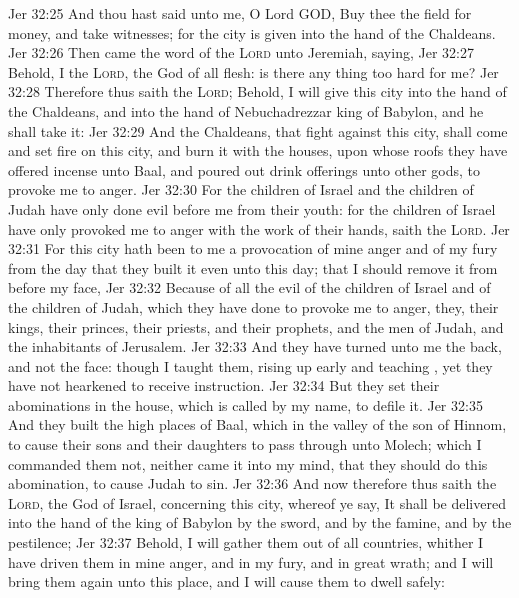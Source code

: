 \vs Jer 32:25 And thou hast said unto me, O Lord GOD, Buy thee the field for money, and take witnesses; for the city is given into the hand of the Chaldeans.
\vs Jer 32:26 Then came the word of the \textsc{Lord} unto Jeremiah, saying,
\vs Jer 32:27 Behold, I  the \textsc{Lord}, the God of all flesh: is there any thing too hard for me?
\vs Jer 32:28 Therefore thus saith the \textsc{Lord}; Behold, I will give this city into the hand of the Chaldeans, and into the hand of Nebuchadrezzar king of Babylon, and he shall take it:
\vs Jer 32:29 And the Chaldeans, that fight against this city, shall come and set fire on this city, and burn it with the houses, upon whose roofs they have offered incense unto Baal, and poured out drink offerings unto other gods, to provoke me to anger.
\vs Jer 32:30 For the children of Israel and the children of Judah have only done evil before me from their youth: for the children of Israel have only provoked me to anger with the work of their hands, saith the \textsc{Lord}.
\vs Jer 32:31 For this city hath been to me  a provocation of mine anger and of my fury from the day that they built it even unto this day; that I should remove it from before my face,
\vs Jer 32:32 Because of all the evil of the children of Israel and of the children of Judah, which they have done to provoke me to anger, they, their kings, their princes, their priests, and their prophets, and the men of Judah, and the inhabitants of Jerusalem.
\vs Jer 32:33 And they have turned unto me the back, and not the face: though I taught them, rising up early and teaching , yet they have not hearkened to receive instruction.
\vs Jer 32:34 But they set their abominations in the house, which is called by my name, to defile it.
\vs Jer 32:35 And they built the high places of Baal, which  in the valley of the son of Hinnom, to cause their sons and their daughters to pass through  unto Molech; which I commanded them not, neither came it into my mind, that they should do this abomination, to cause Judah to sin.
\vs Jer 32:36 And now therefore thus saith the \textsc{Lord}, the God of Israel, concerning this city, whereof ye say, It shall be delivered into the hand of the king of Babylon by the sword, and by the famine, and by the pestilence;
\vs Jer 32:37 Behold, I will gather them out of all countries, whither I have driven them in mine anger, and in my fury, and in great wrath; and I will bring them again unto this place, and I will cause them to dwell safely:
